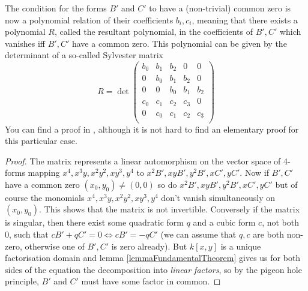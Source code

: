 The condition for the forms $B'$ and $C'$ to have a (non-trivial) common zero is now a polynomial relation of their coefficients $b_i,c_i$, meaning that there exists a polynomial $R$, called the resultant polynomial, in the coefficients of $B',C'$ which vanishes iff $B',C'$ have a common zero.
This polynomial can be given by the determinant of a so-called Sylvester matrix
\begin{equation}
R =
\det\begin{pmatrix}
b_0 & b_1 & b_2 & 0 & 0 \\
0 & b_0 & b_1 & b_2 & 0 \\
0 & 0 & b_0 & b_1 & b_2 \\
c_0 & c_1 & c_2 & c_3 & 0 \\
0 & c_0 & c_1 & c_2 & c_3 \\
\end{pmatrix}
\end{equation}
You can find a proof in \cite[theorem 4.2.3]{brieskorn2012plane}, although it is not hard to find an elementary proof for this particular case.
\begin{proof}
The matrix represents a linear automorphism on the vector space of 4-forms mapping $x^4,x^3y,x^2y^2,xy^3,y^4$ to $x^2B',xyB',y^2B',xC',yC'$.
Now if $B',C'$ have a common zero $(x_0,y_0) \neq (0,0)$ so do $x^2B',xyB',y^2B',xC',yC'$ but of course the monomials $x^4,x^3y,x^2y^2,xy^3,y^4$ don't vanish simultaneously on $(x_0,y_0)$. This shows that the matrix is not invertible.
Conversely if the matrix is singular, then there exist some quadratic form $q$ and a cubic form $c$, not both 0, such that $cB' + qC' = 0 \Leftrightarrow cB' = -qC'$ (we can assume that $q,c$ are both non-zero, otherwise one of $B',C'$ is zero already).
But $k[x,y]$ is a unique factorisation domain and lemma \ref{lemmaFundamentalTheorem} gives us for both sides of the equation the decomposition into \emph{linear factors}, so by the pigeon hole principle, $B'$ and $C'$ must have some factor in common.
\end{proof}

